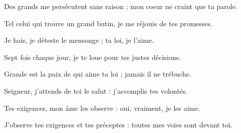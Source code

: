 \item Des grands me persécutent sans raison ; mon coeur ne craint que ta parole.

\item Tel celui qui trouve un grand butin, je me réjouis de tes promesses.

\item Je hais, je déteste le mensonge ; ta loi, je l'aime.

\item Sept fois chaque jour, je te loue pour tes justes décisions.

\item Grande est la paix de qui aime ta loi ; jamais il ne trébuche.

\item Seigneur, j'attends de toi le salut : j'accomplis tes volontés.

\item Tes exigences, mon âme les observe : oui, vraiment, je les aime.

\item J'observe tes exigences et tes préceptes : toutes mes voies sont devant toi.
